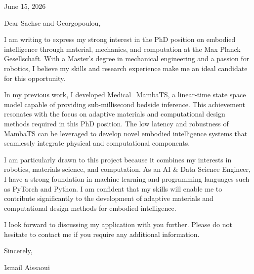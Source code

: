\documentclass{letter}
\begin{document}
\address{\noindent
Max Planck Gesellschaft\\
Munich, Germany}

\signature{\noindent
Ismail Aissaoui}

\opening{\noindent June 15, 2026}

Dear Sachse and Georgopoulou,

I am writing to express my strong interest in the PhD position on embodied intelligence through material, mechanics, and computation at the Max Planck Gesellschaft. With a Master's degree in mechanical engineering and a passion for robotics, I believe my skills and research experience make me an ideal candidate for this opportunity.

In my previous work, I developed Medical_MambaTS, a linear-time state space model capable of providing sub-millisecond bedside inference. This achievement resonates with the focus on adaptive materials and computational design methods required in this PhD position. The low latency and robustness of MambaTS can be leveraged to develop novel embodied intelligence systems that seamlessly integrate physical and computational components.

I am particularly drawn to this project because it combines my interests in robotics, materials science, and computation. As an AI & Data Science Engineer, I have a strong foundation in machine learning and programming languages such as PyTorch and Python. I am confident that my skills will enable me to contribute significantly to the development of adaptive materials and computational design methods for embodied intelligence.

I look forward to discussing my application with you further. Please do not hesitate to contact me if you require any additional information.

Sincerely,

\closing{\noindent
Ismail Aissaoui}
\end{document}
